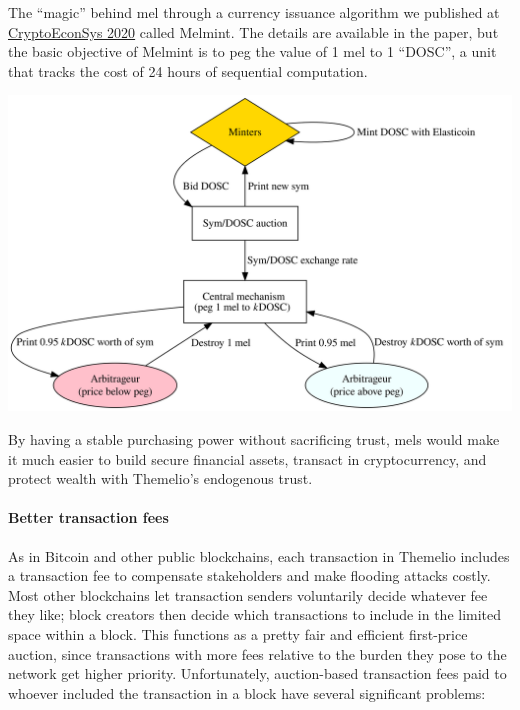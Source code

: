 \documentclass[]{article}
\let\oldparagraph\paragraph
\renewcommand{\paragraph}[1]{\oldparagraph{#1}\mbox{}}
\begin{document}
The ``magic'' behind mel through a currency issuance algorithm we
published at
\href{https://assets.pubpub.org/1tfwdfex/01581339020290.pdf}{CryptoEconSys
2020} called Melmint. The details are available in the paper, but the
basic objective of Melmint is to peg the value of 1 mel to 1 ``DOSC'', a
unit that tracks the cost of 24 hours of sequential computation.

\includegraphics{../.gitbook/assets/graphviz-2-.svg}

By having a stable purchasing power without sacrificing trust, mels
would make it much easier to build secure financial assets, transact in
cryptocurrency, and protect wealth with Themelio's endogenous trust.

\hypertarget{better-transaction-fees}{%
\paragraph{Better transaction fees}\label{better-transaction-fees}}

As in Bitcoin and other public blockchains, each transaction in Themelio
includes a transaction fee to compensate stakeholders and make flooding
attacks costly. Most other blockchains let transaction senders
voluntarily decide whatever fee they like; block creators then decide
which transactions to include in the limited space within a block. This
functions as a pretty fair and efficient first-price auction, since
transactions with more fees relative to the burden they pose to the
network get higher priority. Unfortunately, auction-based transaction
fees paid to whoever included the transaction in a block have several
significant problems:
\end{document}
